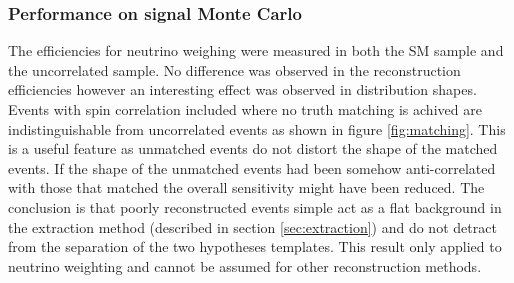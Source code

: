 
\subsubsection{Performance on signal Monte Carlo}
The efficiencies for neutrino weighing were measured in both the SM sample and the uncorrelated sample. No difference was observed in the reconstruction efficiencies however an interesting effect was observed in distribution shapes. Events with spin correlation included where no truth matching is achived are indistinguishable from uncorrelated events as shown in figure \ref{fig:matching}. This is a useful feature as unmatched events do not distort the shape of the matched events. If the shape of the unmatched events had been somehow anti-correlated with those that matched the overall sensitivity might have been reduced. The conclusion is that poorly reconstructed events simple act as a flat background in the extraction method (described in section \ref{sec:extraction}) and do not detract from the separation of the two hypotheses templates. This result only applied to neutrino weighting and cannot be assumed for other reconstruction methods.


